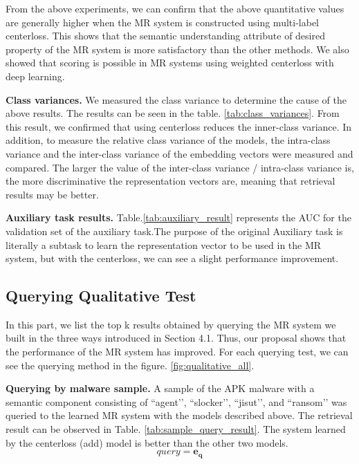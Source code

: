 From the above experiments, we can confirm that the above quantitative values ​​are generally higher when the MR system is constructed using multi-label centerloss. This shows that the semantic understanding attribute of desired property of the MR system is more satisfactory than the other methods. We also showed that scoring is possible in MR systems using weighted centerloss with deep learning.

\textbf{Class variances. }
We measured the class variance to determine the cause of the above results. The results can be seen in the table. \ref{tab:class_variances}. From this result, we confirmed that using centerloss reduces the inner-class variance. In addition, to measure the relative class variance of the models, the intra-class variance and the inter-class variance of the embedding vectors were measured and compared. The larger the value of the inter-class variance / intra-class variance is, the more discriminative the representation vectors are, meaning that retrieval results may be better.

\textbf{Auxiliary task results. }
Table.\ref{tab:auxiliary_result} represents the AUC for the validation set of the auxiliary task.The purpose of the original Auxiliary task is literally a subtask to learn the representation vector to be used in the MR system, but with the centerloss, we can see a slight performance improvement.


\subsection{Querying Qualitative Test}
In this part, we list the top k results obtained by querying the MR system we built in the three ways introduced in Section 4.1. Thus, our proposal shows that the performance of the MR system has improved. For each querying test, we can see the querying method in the figure. \ref{fig:qualitative_all}.

\textbf{Querying by malware sample. }
A sample of the APK malware with a semantic component consisting of ``agent’’, ``slocker’’, ``jisut’’, and ``ransom’’ was queried to the learned MR system with the models described above. The retrieval result can be observed in Table. \ref{tab:sample_query_result}. The system learned by the centerloss (add) model is better than the other two models.
\[
   query = \mathbf{e_q} 
\]


